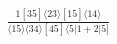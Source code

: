 \documentclass[varwidth, border=5pt]{standalone}
\begin{document}
\begin{my}
$\begin{gathered}
\scriptscriptstyle\frac{1[35]⟨23⟩[15]⟨14⟩}{⟨15⟩⟨34⟩[45]⟨5|1+2|5]}
\end{gathered}$
\end{my}
\end{document}
